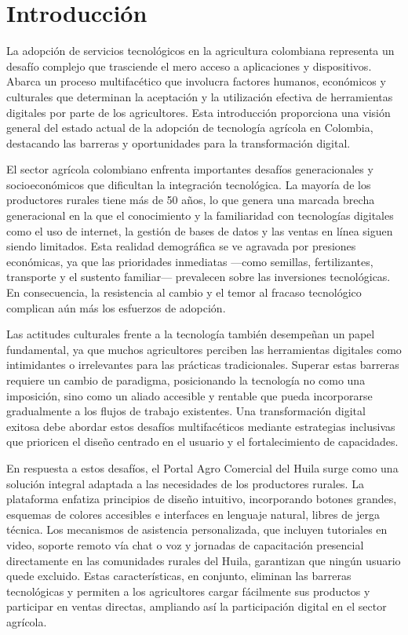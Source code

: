 \section{Introducción}

La adopción de servicios tecnológicos en la agricultura colombiana representa un desafío complejo que trasciende el mero acceso a aplicaciones y dispositivos. Abarca un proceso multifacético que involucra factores humanos, económicos y culturales que determinan la aceptación y la utilización efectiva de herramientas digitales por parte de los agricultores. Esta introducción proporciona una visión general del estado actual de la adopción de tecnología agrícola en Colombia, destacando las barreras y oportunidades para la transformación digital.

El sector agrícola colombiano enfrenta importantes desafíos generacionales y socioeconómicos que dificultan la integración tecnológica. La mayoría de los productores rurales tiene más de 50 años, lo que genera una marcada brecha generacional en la que el conocimiento y la familiaridad con tecnologías digitales como el uso de internet, la gestión de bases de datos y las ventas en línea siguen siendo limitados. Esta realidad demográfica se ve agravada por presiones económicas, ya que las prioridades inmediatas —como semillas, fertilizantes, transporte y el sustento familiar— prevalecen sobre las inversiones tecnológicas. En consecuencia, la resistencia al cambio y el temor al fracaso tecnológico complican aún más los esfuerzos de adopción.

Las actitudes culturales frente a la tecnología también desempeñan un papel fundamental, ya que muchos agricultores perciben las herramientas digitales como intimidantes o irrelevantes para las prácticas tradicionales. Superar estas barreras requiere un cambio de paradigma, posicionando la tecnología no como una imposición, sino como un aliado accesible y rentable que pueda incorporarse gradualmente a los flujos de trabajo existentes. Una transformación digital exitosa debe abordar estos desafíos multifacéticos mediante estrategias inclusivas que prioricen el diseño centrado en el usuario y el fortalecimiento de capacidades.

En respuesta a estos desafíos, el Portal Agro Comercial del Huila surge como una solución integral adaptada a las necesidades de los productores rurales. La plataforma enfatiza principios de diseño intuitivo, incorporando botones grandes, esquemas de colores accesibles e interfaces en lenguaje natural, libres de jerga técnica. Los mecanismos de asistencia personalizada, que incluyen tutoriales en video, soporte remoto vía chat o voz y jornadas de capacitación presencial directamente en las comunidades rurales del Huila, garantizan que ningún usuario quede excluido. Estas características, en conjunto, eliminan las barreras tecnológicas y permiten a los agricultores cargar fácilmente sus productos y participar en ventas directas, ampliando así la participación digital en el sector agrícola.

